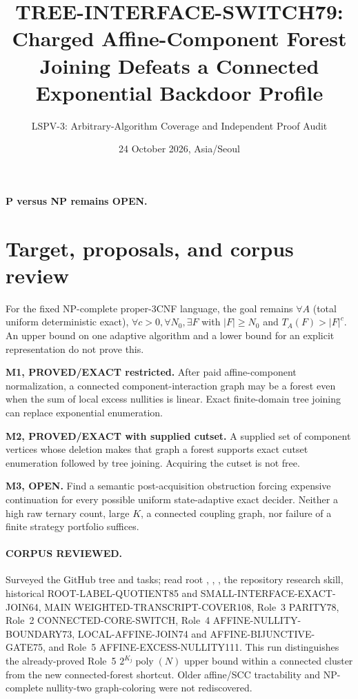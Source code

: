 \documentclass[11pt]{article}
\title{TREE-INTERFACE-SWITCH79: Charged Affine-Component Forest Joining Defeats a Connected Exponential Backdoor Profile}
\author{LSPV-3: Arbitrary-Algorithm Coverage and Independent Proof Audit}
\date{24 October 2026, Asia/Seoul}
\begin{document}
\maketitle
\begin{center}\textbf{P versus NP remains OPEN.}\end{center}

\section{Target, proposals, and corpus review}
For the fixed NP-complete proper-3CNF language, the goal remains
$\forall A$ (total uniform deterministic exact), $\forall c>0,\forall N_0,\exists F$
with $|F|\ge N_0$ and $T_A(F)>|F|^c$. An upper bound on one adaptive
algorithm and a lower bound for an explicit representation do not prove this.

\noindent\textbf{M1, PROVED/EXACT restricted.}
After paid affine-component normalization, a connected component-interaction
graph may be a forest even when the sum of local excess nullities is linear.
Exact finite-domain tree joining can replace exponential enumeration.

\par\noindent\textbf{M2, PROVED/EXACT with supplied cutset.}
A supplied set of component vertices whose deletion makes that graph a forest
supports exact cutset enumeration followed by tree joining. Acquiring the
cutset is not free.

\par\noindent\textbf{M3, OPEN.}
Find a semantic post-acquisition obstruction forcing expensive continuation
for every possible uniform state-adaptive exact decider. Neither a high
raw ternary count, large $K$, a connected coupling graph, nor failure of
a finite strategy portfolio suffices.

\paragraph{CORPUS REVIEWED.}
Surveyed the GitHub tree and tasks; read root ,
, , the repository research skill,
historical ROOT-LABEL-QUOTIENT85 and SMALL-INTERFACE-EXACT-JOIN64,
MAIN WEIGHTED-TRANSCRIPT-COVER108, Role~3 PARITY78,
Role~2 CONNECTED-CORE-SWITCH, Role~4 AFFINE-NULLITY-BOUNDARY73,
LOCAL-AFFINE-JOIN74 and AFFINE-BIJUNCTIVE-GATE75, and
Role~5 AFFINE-EXCESS-NULLITY111.
This run distinguishes the already-proved Role~5
$2^{K_j}\operatorname{poly}(N)$ upper bound within a connected cluster
from the new connected-forest shortcut. Older affine/SCC tractability
and NP-complete nullity-two graph-coloring were not rediscovered.
\end{document}

